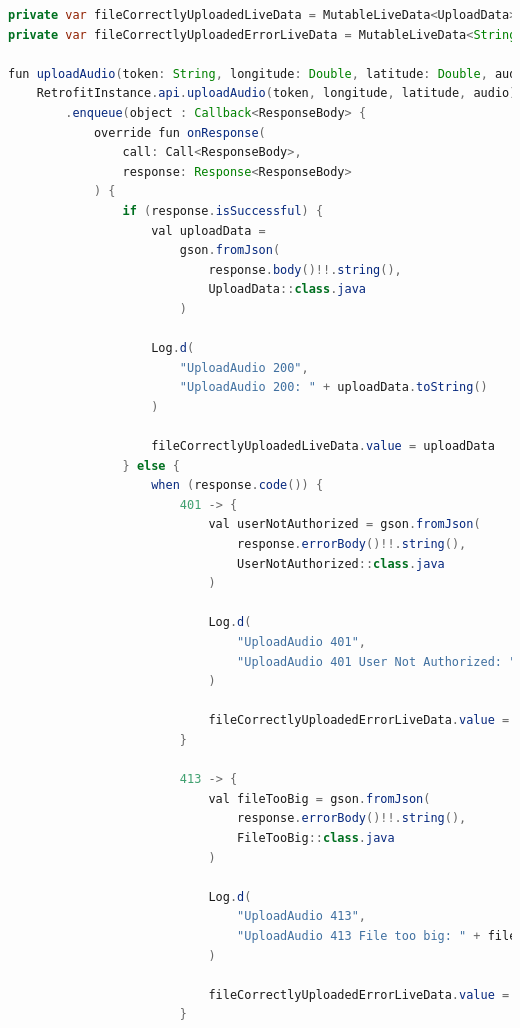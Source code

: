 \documentclass{article}
\begin{document}
\begin{lstlisting}[language = JAVA]
private var fileCorrectlyUploadedLiveData = MutableLiveData<UploadData>()
private var fileCorrectlyUploadedErrorLiveData = MutableLiveData<String>()

fun uploadAudio(token: String, longitude: Double, latitude: Double, audio: MultipartBody.Part) {
    RetrofitInstance.api.uploadAudio(token, longitude, latitude, audio)
        .enqueue(object : Callback<ResponseBody> {
            override fun onResponse(
                call: Call<ResponseBody>,
                response: Response<ResponseBody>
            ) {
                if (response.isSuccessful) {
                    val uploadData =
                        gson.fromJson(
                            response.body()!!.string(),
                            UploadData::class.java
                        )

                    Log.d(
                        "UploadAudio 200",
                        "UploadAudio 200: " + uploadData.toString()
                    )

                    fileCorrectlyUploadedLiveData.value = uploadData
                } else {
                    when (response.code()) {
                        401 -> {
                            val userNotAuthorized = gson.fromJson(
                                response.errorBody()!!.string(),
                                UserNotAuthorized::class.java
                            )

                            Log.d(
                                "UploadAudio 401",
                                "UploadAudio 401 User Not Authorized: " + userNotAuthorized.detail
                            )

                            fileCorrectlyUploadedErrorLiveData.value = userNotAuthorized.detail
                        }

                        413 -> {
                            val fileTooBig = gson.fromJson(
                                response.errorBody()!!.string(),
                                FileTooBig::class.java
                            )

                            Log.d(
                                "UploadAudio 413",
                                "UploadAudio 413 File too big: " + fileTooBig.detail
                            )

                            fileCorrectlyUploadedErrorLiveData.value = fileTooBig.detail
                        }


\end{lstlisting}
\end{document}
